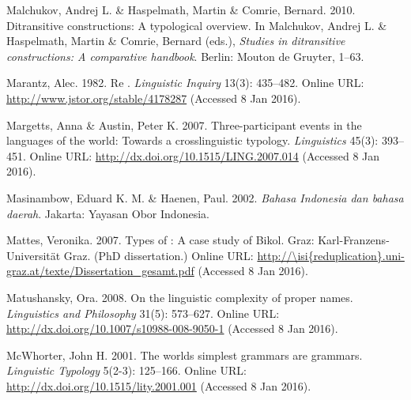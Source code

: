 \begin{styleCitaviBibliographyEntry}
Malchukov, Andrej L. \& Haspelmath, Martin \& Comrie, Bernard. 2010. Ditransitive constructions: A typological overview. In Malchukov, Andrej L. \& Haspelmath, Martin \& Comrie, Bernard (eds.), \textit{Studies in ditransitive constructions: A comparative handbook}. Berlin: Mouton de Gruyter, 1–63.
\end{styleCitaviBibliographyEntry}

\begin{styleCitaviBibliographyEntry}
Marantz, Alec. 1982. Re . \textit{Linguistic Inquiry} 13(3): 435–482. Online URL: \url{http://www.jstor.org/stable/4178287} (Accessed 8 Jan 2016).
\end{styleCitaviBibliographyEntry}

\begin{styleCitaviBibliographyEntry}
Margetts, Anna \& Austin, Peter K. 2007. Three-participant events in the languages of the world: Towards a crosslinguistic typology. \textit{Linguistics} 45(3): 393–451. Online URL: \url{http://dx.doi.org/10.1515/LING.2007.014} (Accessed 8 Jan 2016).
\end{styleCitaviBibliographyEntry}

\begin{styleCitaviBibliographyEntry}
Masinambow, Eduard K. M. \& Haenen, Paul. 2002. \textit{Bahasa Indonesia dan bahasa daerah}. Jakarta: Yayasan Obor Indonesia.
\end{styleCitaviBibliographyEntry}

\begin{styleCitaviBibliographyEntry}
Mattes, Veronika. 2007. Types of : A case study of Bikol. Graz: Karl-Franzens-Universität Graz. (PhD dissertation.) Online URL: \url{http://\isi{reduplication}.uni-graz.at/texte/Dissertation_gesamt.pdf} (Accessed 8 Jan 2016).
\end{styleCitaviBibliographyEntry}

\begin{styleCitaviBibliographyEntry}
Matushansky, Ora. 2008. On the linguistic complexity of proper names. \textit{Linguistics and Philosophy} 31(5): 573–627. Online URL: \url{http://dx.doi.org/10.1007/s10988-008-9050-1} (Accessed 8 Jan 2016).
\end{styleCitaviBibliographyEntry}

\begin{styleCitaviBibliographyEntry}
McWhorter, John H. 2001. The worlds simplest grammars are  grammars. \textit{Linguistic Typology} 5(2-3): 125–166. Online URL: \url{http://dx.doi.org/10.1515/lity.2001.001} (Accessed 8 Jan 2016).
\end{styleCitaviBibliographyEntry}

